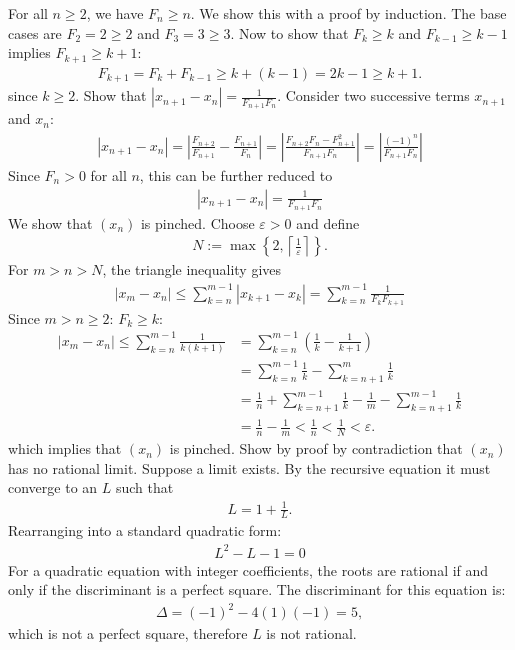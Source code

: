\documentclass{amsart}
\numberwithin{equation}{section}
\let\oldendproof\endproof
\renewenvironment{proof}[1][\proofname]{%
  \setcounter{case}{0}
  \setcounter{step}{0}
  \oldproof[#1]%
}{\oldendproof}
\theoremstyle{plain}
\theoremstyle{definition}
\theoremstyle{remark}
\begin{document}
\begin{proof}
  \step For all $n \geq 2$, we have $F_n\geq n$.
  We show this with a proof by induction.
  The base cases are $F_2=2\geq2$ and $F_3=3\geq3$.
  Now to show that $F_k \geq k$ and $F_{k-1}\geq k-1$ implies $F_{k+1}\geq k+1$:
  \begin{align*}
    F_{k+1} = F_k+F_{k-1} \geq k + (k-1) = 2k-1 \geq k+1.
  \end{align*}
  since $k\geq2$.
  \step Show that $|x_{n+1}-x_n|=\frac{1}{F_{n+1}F_n}$.
  Consider two successive terms $x_{n+1}$ and $x_n$:
  \begin{align*}
    |x_{n+1} - x_n| = \left|\frac{F_{n+2}}{F_{n+1}}-\frac{F_{n+1}}{F_n}\right| = \left|\frac{F_{n+2}F_n-F_{n+1}^2}{F_{n+1}F_n}\right|=\left| \frac{(-1)^n}{F_{n+1}F_n}\right|
  \end{align*}
  Since $F_n>0$ for all $n$, this can be further reduced to
  \begin{align*}
    |x_{n+1} - x_n| = \frac{1}{F_{n+1}F_n}
  \end{align*}
  \step We show that $(x_n)$ is pinched. Choose $\varepsilon>0$ and define
  \begin{align*}
    N:=\max\left\{2, \left\lceil\frac{1}{\varepsilon}\right\rceil\right\}.
  \end{align*}
  For $m>n>N$, the triangle inequality gives
  \begin{align*}
    |x_m-x_n| \leq \sum^{m-1}_{k=n} |x_{k+1}-x_k| = \sum^{m-1}_{k=n} \frac{1}{F_kF_{k+1}}
  \end{align*}
  Since $m>n\geq2$: $F_k \geq k$:
  \begin{align*}
    |x_m-x_n| \leq \sum^{m-1}_{k=n}\frac{1}{k(k+1)} &= \sum^{m-1}_{k=n} \left(\frac{1}{k}-\frac{1}{k+1}\right)\\
    &= \sum^{m-1}_{k=n}\frac{1}{k}-\sum^m_{k=n+1}\frac{1}{k} \\
    &= \frac{1}{n}+\sum^{m-1}_{k=n+1}\frac{1}{k}-\frac{1}{m}-\sum^{m-1}_{k=n+1}\frac{1}{k} \\
    &= \frac{1}{n} - \frac{1}{m} < \frac{1}{n} < \frac{1}{N}<\varepsilon.
  \end{align*}
  which implies that $(x_n)$ is pinched.
  \step Show by proof by contradiction that $(x_n)$ has no rational limit. Suppose a limit exists. By the recursive equation it must converge to an $L$ such that
  \begin{align*}
    L = 1 + \frac{1}{L}.
  \end{align*}
  Rearranging into a standard quadratic form:
  \begin{align*}
    L^2-L-1 = 0
  \end{align*}
  For a quadratic equation with integer coefficients, the roots are rational if and only if the discriminant is a perfect square.
  The discriminant for this equation is:
  \begin{align*}
    \Delta=(-1)^2-4(1)(-1)=5,
  \end{align*}
  which is not a perfect square, therefore $L$ is not rational.
\end{proof}
\end{document}
